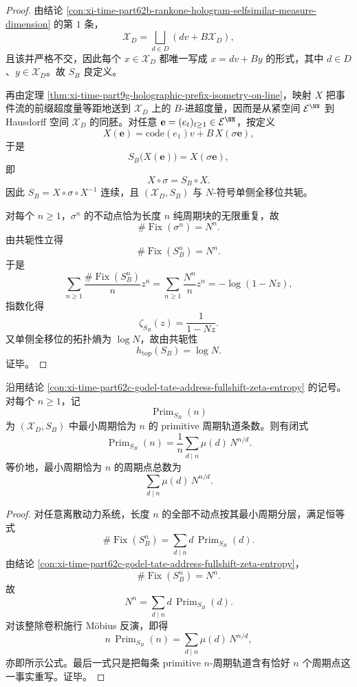 \begin{proof}
由结论 \ref{con:xi-time-part62b-rankone-hologram-selfsimilar-measure-dimension} 的第 \(1\) 条，
\[
\mathcal X_D=\bigsqcup_{d\in D}(dv+B\mathcal X_D),
\]
且该并严格不交，因此每个 \(x\in\mathcal X_D\) 都唯一写成 \(x=dv+By\) 的形式，其中 \(d\in D\)、\(y\in\mathcal X_D\)。故 \(S_B\) 良定义。

再由定理 \ref{thm:xi-time-part9g-holographic-prefix-isometry-on-line}，映射 \(X\) 把事件流的前缀超度量等距地送到 \(\mathcal X_D\) 上的 \(B\)-进超度量，因而是从紧空间 \(\mathcal E^{\NN}\) 到 Hausdorff 空间 \(\mathcal X_D\) 的同胚。对任意 \(\mathbf e=(e_t)_{t\ge 1}\in\mathcal E^{\NN}\)，按定义
\[
X(\mathbf e)=\mathrm{code}(e_1)v+B\,X(\sigma\mathbf e),
\]
于是
\[
S_B\bigl(X(\mathbf e)\bigr)=X(\sigma\mathbf e),
\]
即
\[
X\circ \sigma=S_B\circ X.
\]
因此 \(S_B=X\circ \sigma\circ X^{-1}\) 连续，且 \((\mathcal X_D,S_B)\) 与 \(N\)-符号单侧全移位共轭。

对每个 \(n\ge 1\)，\(\sigma^n\) 的不动点恰为长度 \(n\) 纯周期块的无限重复，故
\[
\#\operatorname{Fix}(\sigma^n)=N^n.
\]
由共轭性立得
\[
\#\operatorname{Fix}(S_B^n)=N^n.
\]
于是
\[
\sum_{n\ge 1}\frac{\#\operatorname{Fix}(S_B^n)}{n}z^n
=
\sum_{n\ge 1}\frac{N^n}{n}z^n
=
-\log(1-Nz),
\]
指数化得
\[
\zeta_{S_B}(z)=\frac{1}{1-Nz}.
\]
又单侧全移位的拓扑熵为 \(\log N\)，故由共轭性
\[
h_{\mathrm{top}}(S_B)=\log N.
\]
证毕。
\end{proof}

\begin{corollary}\label{cor:xi-time-part62c-godel-tate-address-primitive-periodic-count}
沿用结论 \ref{con:xi-time-part62c-godel-tate-address-fullshift-zeta-entropy} 的记号。对每个 \(n\ge 1\)，记
\[
\operatorname{Prim}_{S_B}(n)
\]
为 \((\mathcal X_D,S_B)\) 中最小周期恰为 \(n\) 的 primitive 周期轨道条数。则有闭式
\[
\operatorname{Prim}_{S_B}(n)
=
\frac{1}{n}\sum_{d\mid n}\mu(d)\,N^{n/d}.
\]
等价地，最小周期恰为 \(n\) 的周期点总数为
\[
\sum_{d\mid n}\mu(d)\,N^{n/d}.
\]
\end{corollary}
\begin{proof}
对任意离散动力系统，长度 \(n\) 的全部不动点按其最小周期分层，满足恒等式
\[
\#\operatorname{Fix}(S_B^n)
=
\sum_{d\mid n} d\,\operatorname{Prim}_{S_B}(d).
\]
由结论 \ref{con:xi-time-part62c-godel-tate-address-fullshift-zeta-entropy}，
\[
\#\operatorname{Fix}(S_B^n)=N^n.
\]
故
\[
N^n=\sum_{d\mid n} d\,\operatorname{Prim}_{S_B}(d).
\]
对该整除卷积施行 Möbius 反演，即得
\[
n\,\operatorname{Prim}_{S_B}(n)=\sum_{d\mid n}\mu(d)\,N^{n/d},
\]
亦即所示公式。最后一式只是把每条 primitive \(n\)-周期轨道含有恰好 \(n\) 个周期点这一事实重写。证毕。
\end{proof}

